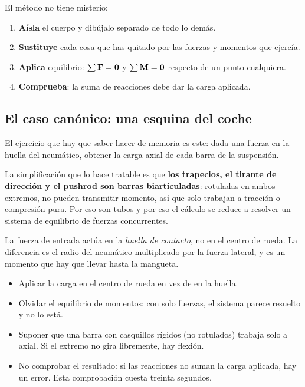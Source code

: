 El método no tiene misterio:

\begin{enumerate}
  \item \textbf{Aísla} el cuerpo y dibújalo separado de todo lo demás.
  \item \textbf{Sustituye} cada cosa que has quitado por las fuerzas y momentos
        que ejercía.
  \item \textbf{Aplica} equilibrio: $\sum \mathbf{F} = \mathbf{0}$ y
        $\sum \mathbf{M} = \mathbf{0}$ respecto de un punto cualquiera.
  \item \textbf{Comprueba}: la suma de reacciones debe dar la carga aplicada.
\end{enumerate}

\subsection{El caso canónico: una esquina del coche}

El ejercicio que hay que saber hacer de memoria es este: dada una fuerza en la
huella del neumático, obtener la carga axial de cada barra de la suspensión.

La simplificación que lo hace tratable es que \textbf{los trapecios, el tirante
de dirección y el push\-rod son barras biarticuladas}: rotuladas en ambos
extremos, no pueden transmitir momento, así que solo trabajan a tracción o
compresión pura. Por eso son tubos y por eso el cálculo se reduce a resolver un
sistema de equilibrio de fuerzas concurrentes.

La fuerza de entrada actúa en la \emph{huella de contacto}, no en el centro de
rueda. La diferencia es el radio del neumático multiplicado por la fuerza
lateral, y es un momento que hay que llevar hasta la mangueta.

\begin{ojo}
\begin{itemize}
  \item Aplicar la carga en el centro de rueda en vez de en la huella.
  \item Olvidar el equilibrio de momentos: con solo fuerzas, el sistema parece
        resuelto y no lo está.
  \item Suponer que una barra con casquillos rígidos (no rotulados) trabaja solo
        a axial. Si el extremo no gira libremente, hay flexión.
  \item No comprobar el resultado: si las reacciones no suman la carga aplicada,
        hay un error. Esta comprobación cuesta treinta segundos.
\end{itemize}
\end{ojo}

